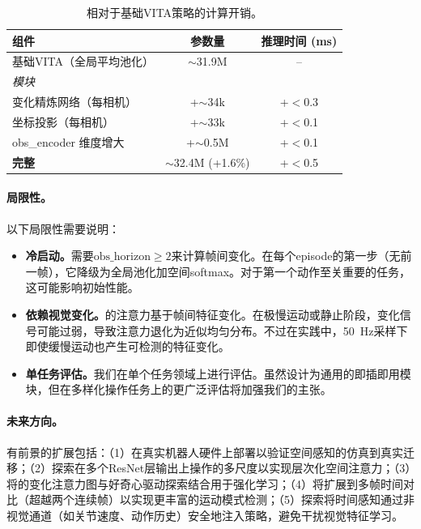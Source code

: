 \begin{table}[t]
\centering
\caption{\fasa{}相对于基础VITA策略的计算开销。}
\label{tab:compute}
\begin{tabular}{lcc}
\toprule
\textbf{组件} & \textbf{参数量} & \textbf{推理时间 (ms)} \\
\midrule
基础VITA（全局平均池化） & $\sim$31.9M & -- \\
\midrule
\multicolumn{3}{l}{\textit{\fasa{}模块}} \\
\quad 变化精炼网络（每相机） & +$\sim$34k & +$<$0.3 \\
\quad 坐标投影（每相机） & +$\sim$33k & +$<$0.1 \\
\quad obs\_encoder 维度增大 & +$\sim$0.5M & +$<$0.1 \\
\midrule
\textbf{完整\method{}} & $\sim$32.4M (+1.6\%) & +$<$0.5 \\
\bottomrule
\end{tabular}
\end{table}

\paragraph{局限性。}以下局限性需要说明：
\begin{itemize}[leftmargin=*,itemsep=2pt]
    \item \textbf{\fasa{}冷启动。}\fasa{}需要$\text{obs\_horizon} \geq 2$来计算帧间变化。在每个episode的第一步（无前一帧），它降级为全局池化加空间softmax。对于第一个动作至关重要的任务，这可能影响初始性能。
    \item \textbf{依赖视觉变化。}\fasa{}的注意力基于帧间特征变化。在极慢运动或静止阶段，变化信号可能过弱，导致注意力退化为近似均匀分布。不过在实践中，50~Hz采样下即使缓慢运动也产生可检测的特征变化。
    \item \textbf{单任务评估。}我们在单个任务领域上进行评估。虽然\fasa{}设计为通用的即插即用模块，但在多样化操作任务上的更广泛评估将加强我们的主张。
\end{itemize}

\paragraph{未来方向。}有前景的扩展包括：（1）在真实机器人硬件上部署\method{}以验证空间感知的仿真到真实迁移；（2）探索在多个ResNet层输出上操作的多尺度\fasa{}以实现层次化空间注意力；（3）将\fasa{}的变化注意力图与好奇心驱动探索结合用于强化学习；（4）将\fasa{}扩展到多帧时间对比（超越两个连续帧）以实现更丰富的运动模式检测；（5）探索将时间感知通过非视觉通道（如关节速度、动作历史）安全地注入策略，避免干扰视觉特征学习。
